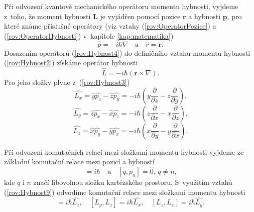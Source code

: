 Při odvození kvantově mechanického operátoru momentu hybnosti, vyjdeme z~toho, že moment hybnosti $\mathbf{L}$ je vyjádřen pomocí pozice $\mathbf{r}$ a hybnosti $\mathbf{p}$, pro které známe příslušné operátory (viz vztahy (\ref{rov:OperatorPozice}) a (\ref{rov:OperatorHybnosti}) v~kapitole \ref{kap:matematika})
\begin{equation}
\hat{p} = -i \hbar \nabla \quad \mbox{a} \quad \hat{r}=\mathbf{r} \mbox{.}
\label{rov:Hybnost4}
\end{equation}
Dosazením operátorů (\ref{rov:Hybnost4}) do definičního vztahu momentu hybnosti (\ref{rov:Hybnost2}) získáme operátor hybnosti
\begin{equation}
\boxed{\hat{L}= -i \hbar (\mathbf{r} \times \nabla) \mbox{.}}
\label{rov:Hybnost5}
\end{equation}
Pro jeho složky plyne z~(\ref{rov:Hybnost3})
\begin{equation}
\hat{L_x}=\hat{y}\hat{p_z}-\hat{z}\hat{p_y} = -i\hbar \left( y \frac{\partial}{\partial z} - z \frac{\partial}{\partial y} \right) \mbox{,}
\label{rov:Hybnost6}
\end{equation}
\begin{equation}
\hat{L_y}=\hat{z}\hat{p_x}-\hat{x}\hat{p_z} = -i\hbar \left( z \frac{\partial}{\partial x} - x \frac{\partial}{\partial z} \right) \mbox{,}
\label{rov:Hybnost7}
\end{equation}
\begin{equation}
\hat{L_z}=\hat{x}\hat{p_y}-\hat{y}\hat{p_x} = -i\hbar \left( x \frac{\partial}{\partial y} - y \frac{\partial}{\partial x} \right) \mbox{.}
\label{rov:Hybnost8}
\end{equation}

Při odvození komutačních relací mezi složkami momentu hybnosti vyjdeme ze základní komutační relace mezi pozicí a hybností
\begin{equation}
[q,p_q] = i \hbar \quad \mbox{a} \quad [q,p_n]=\hat{0}, \, q\not = n \mbox{,}
\label{rov:Hybnost9}
\end{equation}
kde $q$ i $n$ značí libovolnou složku kartézského prostoru. S~využitím vztahů (\ref{rov:Hybnost9}) odvodíme komutační relace mezi složkami momentu hybnosti
\begin{equation}
[L_x,L_y] = i\hbar \hat{L_z}, \quad [L_y,L_z] = i\hbar \hat{L_x}, \quad [L_z,L_x] = i\hbar \hat{L_y} \mbox{.}
\label{rov:Hybnost10}
\end{equation}

